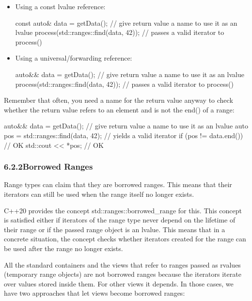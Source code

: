 \begin{itemize}
\item
Using a const lvalue reference:

\begin{cpp}
const auto& data = getData(); // give return value a name to use it as an lvalue
process(std::ranges::find(data, 42)); // passes a valid iterator to process()
\end{cpp}

\item
Using a universal/forwarding reference:

\begin{cpp}
auto&& data = getData(); // give return value a name to use it as an lvalue
process(std::ranges::find(data, 42)); // passes a valid iterator to process()
\end{cpp}
\end{itemize}

Remember that often, you need a name for the return value anyway to check whether the return value refers to an element and is not the end() of a range:

\begin{cpp}
auto&& data = getData(); // give return value a name to use it as an lvalue
auto pos = std::ranges::find(data, 42); // yields a valid iterator
if (pos != data.end()) { // OK
	std::cout << *pos; // OK
}
\end{cpp}

\subsubsection*{ 6.2.2\hspace{0.2cm}Borrowed Ranges}

Range types can claim that they are borrowed ranges. This means that their iterators can still be used when the range itself no longer exists.

C++20 provides the concept std::ranges::borrowed\_range for this. This concept is satisfied either if iterators of the range type never depend on the lifetime of their range or if the passed range object is an lvalue. This means that in a concrete situation, the concept checks whether iterators created for the range can be used after the range no longer exists.

All the standard containers and the views that refer to ranges passed as rvalues (temporary range objects) are not borrowed ranges because the iterators iterate over values stored inside them. For other views it depends. In those cases, we have two approaches that let views become borrowed ranges:

